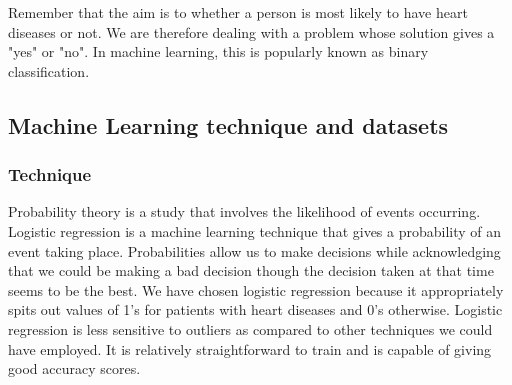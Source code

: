 Remember that the aim is to whether a person is most likely to have heart diseases or not. We are therefore dealing with a problem whose solution gives a "yes" or "no". In machine learning, this is popularly known as binary classification.  

\subsection{Machine Learning technique and datasets}
\subsubsection{Technique}
Probability theory is a study that involves the likelihood of events occurring. Logistic regression is a machine learning technique that gives a probability of an event taking place. Probabilities allow us to make decisions while acknowledging that we could be making a bad decision though the decision taken at that time seems to be the best. We have chosen logistic regression because it appropriately spits out values of 1's for patients with heart diseases and 0's otherwise. Logistic regression is less sensitive to outliers as compared to other techniques we could have employed. It is relatively straightforward to train and is capable of giving good accuracy scores.

